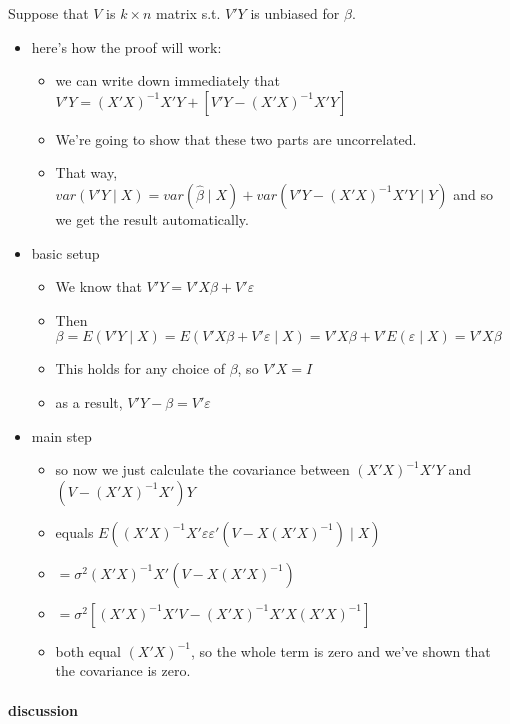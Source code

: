        Suppose that $V$ is $k \times n$ matrix s.t. $V'Y$ is unbiased
        for $\beta$.
\begin{itemize}
\item here's how the proof will work:
\begin{itemize}
\item we can write down immediately that $V'Y = (X'X)^{-1}X'Y +
            [V'Y - (X'X)^{-1} X'Y]$
\item We're going to show that these two parts are uncorrelated.
\item That way, $var(V'Y \mid X) = var(\hat \beta \mid X) +
            var(V'Y - (X'X)^{-1}X'Y \mid Y)$ and so we get the result
            automatically.
\end{itemize}
\item basic setup
\begin{itemize}
\item We know that $V'Y = V'X\beta + V'\varepsilon$
\item Then $\beta = E(V'Y \mid X) = E(V'X\beta + V'\varepsilon \mid
            X) = V'X \beta + V'E(\varepsilon \mid X) = V'X\beta$
\item This holds for any choice of $\beta$, so $V'X = I$
\item as a result, $V'Y - \beta = V'\varepsilon$
\end{itemize}
\item main step
\begin{itemize}
\item so now we just calculate the covariance between
            $(X'X)^{-1}X'Y$ and $(V - (X'X)^{-1}X')Y$
\item equals $E((X'X)^{-1}X'\varepsilon \varepsilon'(V -
            X(X'X)^{-1}) \mid X)$
\item $= \sigma^2 (X'X)^{-1}X'(V - X(X'X)^{-1})$
\item $= \sigma^2 [(X'X)^{-1}X'V - (X'X)^{-1} X'X (X'X)^{-1}]$
\item both equal $(X'X)^{-1}$, so the whole term is zero and we've
            shown that the covariance is zero.
\end{itemize}
\end{itemize}
\paragraph{discussion}
\label{sec-3-1-5-1-2}

